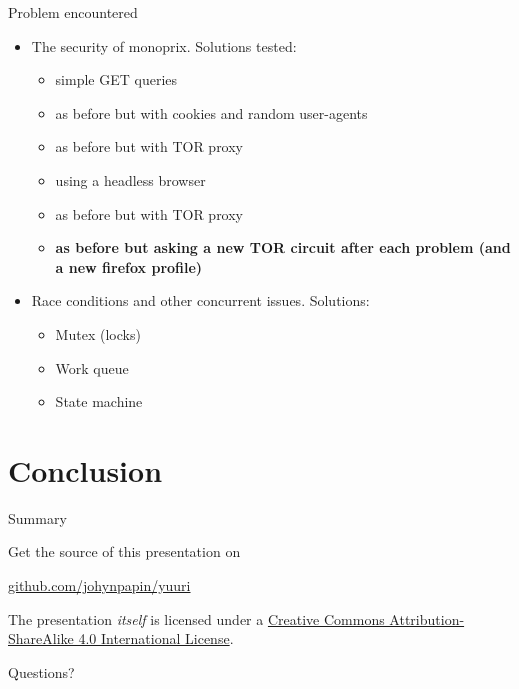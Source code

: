\documentclass[10pt]{beamer}
\begin{document}
\begin{frame}{Problem encountered}
    \begin{itemize}
        \item The security of monoprix. Solutions tested:
        \begin{itemize}
            \item simple GET queries
            \item as before but with cookies and random user-agents
            \item as before but with TOR proxy
            \item using a headless browser
            \item as before but with TOR proxy
            \item \textbf{as before but asking a new TOR circuit after each problem (and a new firefox profile)}
        \end{itemize}
        \item Race conditions and other concurrent issues. Solutions:
        \begin{itemize}
            \item Mutex (locks)
            \item Work queue
            \item State machine
        \end{itemize}
    \end{itemize}
\end{frame}

\section{Conclusion}

\begin{frame}{Summary}

  Get the source of this presentation on

  \begin{center}\url{github.com/johynpapin/yuuri}\end{center}

  The presentation \emph{itself} is licensed under a
  \href{http://creativecommons.org/licenses/by-sa/4.0/}{Creative Commons
  Attribution-ShareAlike 4.0 International License}.

  \begin{center}\ccbysa\end{center}

\end{frame}

\begin{frame}[standout]
  Questions?
\end{frame}

\appendix
\end{document}
